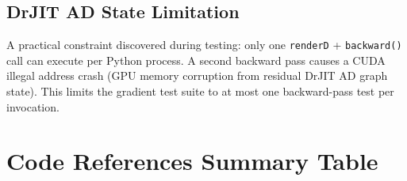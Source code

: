 \subsection{DrJIT AD State Limitation}

A practical constraint discovered during testing: only one
\texttt{renderD} + \texttt{backward()} call can execute per Python process.
A second backward pass causes a CUDA illegal address crash (GPU memory
corruption from residual DrJIT AD graph state). This limits the gradient
test suite to at most one backward-pass test per invocation.

\section{Code References Summary Table}
\label{sec:references}

